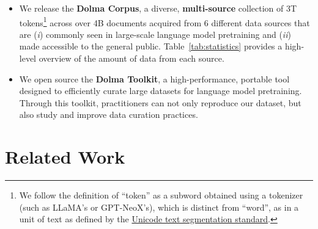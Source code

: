 \documentclass{article}
\newcommand{\dolma}{Dolma\xspace}
\begin{document}
\begin{itemize}[leftmargin=1em,topsep=1mm,itemsep=1mm]
    \item We release the \textbf{\dolma Corpus}, a diverse, \textbf{multi-source} collection of 3T tokens\footnote{We follow the definition of ``token'' as a subword obtained using a tokenizer (such as LLaMA’s or GPT-NeoX’s), which is distinct from ``word'', as in a unit of text as defined by the \href{https://unicode.org/reports/tr29/}{Unicode text segmentation standard}.} across over 4B documents acquired from 6 different data sources that are (\textit{i}) commonly seen in large-scale language model pretraining and (\textit{ii}) made accessible to the general public.  
    Table~\ref{tab:statistics} provides a high-level overview of the amount of data from each source.
    \item We open source the \textbf{\dolma Toolkit}, a high-performance, portable tool designed to efficiently curate large datasets for language model pretraining. 
    Through this toolkit, practitioners can not only reproduce our dataset, but also study and improve data curation practices. 
\end{itemize}

\section{Related Work}
\label{sec:related-work}
\end{document}
